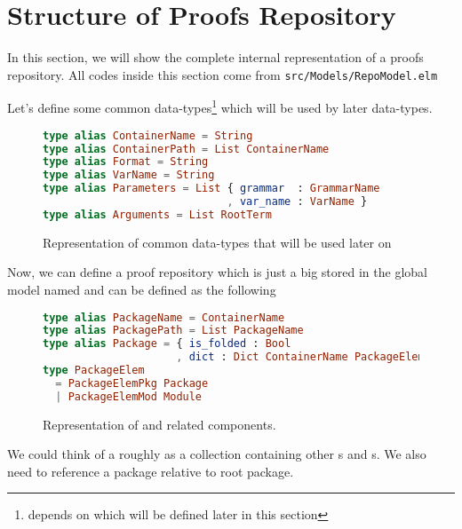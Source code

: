 \documentclass[master.tex]{subfiles}
\begin{document}
\section{Structure of Proofs Repository}
In this section, we will show the complete internal representation of a proofs
repository. All codes inside this section come from
\texttt{src/Models/RepoModel.elm}

Let's define some common data-types\footnote{ depends on
   which will be defined later in this section} which will be
used by later data-types.

\begin{figure}[H]
\begin{framed}
\begin{lstlisting}[language=elm]
type alias ContainerName = String
type alias ContainerPath = List ContainerName
type alias Format = String
type alias VarName = String
type alias Parameters = List { grammar  : GrammarName
                             , var_name : VarName }
type alias Arguments = List RootTerm
\end{lstlisting}
\end{framed}
\caption{Representation of common data-types that will be used later on}
\label{fig:implementation-repo-common}
\end{figure}

Now, we can define a proof repository which is just a big  stored
in the global model named  and can be defined as the
following

\begin{figure}[H]
\begin{framed}
\begin{lstlisting}[language=elm]
type alias PackageName = ContainerName
type alias PackagePath = List PackageName
type alias Package = { is_folded : Bool
                     , dict : Dict ContainerName PackageElem }
type PackageElem
  = PackageElemPkg Package
  | PackageElemMod Module
\end{lstlisting}
\end{framed}
\caption{Representation of  and related components.}
\label{fig:implementation-repo-package}
\end{figure}

We could think of a  roughly as a collection containing other
s and s. We also need  to
reference a package relative to root package.
\end{document}
